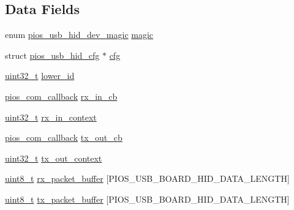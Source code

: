 \subsection*{Data Fields}
\begin{DoxyCompactItemize}
\item 
enum \hyperlink{group___p_i_o_s___u_s_b___h_i_d_ga7769ddfbb58cbf13d0e0662f4d441899}{pios\-\_\-usb\-\_\-hid\-\_\-dev\-\_\-magic} \hyperlink{group___p_i_o_s___u_s_b___h_i_d_ga31a2e7a6eac13138808d37592a55be4e}{magic}
\item 
struct \hyperlink{structpios__usb__hid__cfg}{pios\-\_\-usb\-\_\-hid\-\_\-cfg} $\ast$ \hyperlink{group___p_i_o_s___u_s_b___h_i_d_gaed58572b60b7d6cfa67fd0c4d66e882c}{cfg}
\item 
\hyperlink{stdint_8h_a435d1572bf3f880d55459d9805097f62}{uint32\-\_\-t} \hyperlink{group___p_i_o_s___u_s_b___h_i_d_ga088a37cd66d7047583d47a16a3381e4f}{lower\-\_\-id}
\item 
\hyperlink{group___p_i_o_s___c_o_m_ga23f1888821f1f74a50c02adc459df597}{pios\-\_\-com\-\_\-callback} \hyperlink{group___p_i_o_s___u_s_b___h_i_d_ga0d491f712337fdf9d08be6c72ac81094}{rx\-\_\-in\-\_\-cb}
\item 
\hyperlink{stdint_8h_a435d1572bf3f880d55459d9805097f62}{uint32\-\_\-t} \hyperlink{group___p_i_o_s___u_s_b___h_i_d_ga2ce875c5efa2b6b450f143818872513a}{rx\-\_\-in\-\_\-context}
\item 
\hyperlink{group___p_i_o_s___c_o_m_ga23f1888821f1f74a50c02adc459df597}{pios\-\_\-com\-\_\-callback} \hyperlink{group___p_i_o_s___u_s_b___h_i_d_ga04c76a0e0e88338371d2f12cd9749309}{tx\-\_\-out\-\_\-cb}
\item 
\hyperlink{stdint_8h_a435d1572bf3f880d55459d9805097f62}{uint32\-\_\-t} \hyperlink{group___p_i_o_s___u_s_b___h_i_d_ga1a95563a3fb1aee312d7793c77f81bf2}{tx\-\_\-out\-\_\-context}
\item 
\hyperlink{stdint_8h_aba7bc1797add20fe3efdf37ced1182c5}{uint8\-\_\-t} \hyperlink{group___p_i_o_s___u_s_b___h_i_d_ga20fb92cd6b239abc72cb0ac8b93b11b4}{rx\-\_\-packet\-\_\-buffer} \mbox{[}P\-I\-O\-S\-\_\-\-U\-S\-B\-\_\-\-B\-O\-A\-R\-D\-\_\-\-H\-I\-D\-\_\-\-D\-A\-T\-A\-\_\-\-L\-E\-N\-G\-T\-H\mbox{]}
\item 
\hyperlink{stdint_8h_aba7bc1797add20fe3efdf37ced1182c5}{uint8\-\_\-t} \hyperlink{group___p_i_o_s___u_s_b___h_i_d_gad6c7b8ecc0fe215e9d18d6d3281977c6}{tx\-\_\-packet\-\_\-buffer} \mbox{[}P\-I\-O\-S\-\_\-\-U\-S\-B\-\_\-\-B\-O\-A\-R\-D\-\_\-\-H\-I\-D\-\_\-\-D\-A\-T\-A\-\_\-\-L\-E\-N\-G\-T\-H\mbox{]}
\item 

\end{DoxyCompactItemize}
